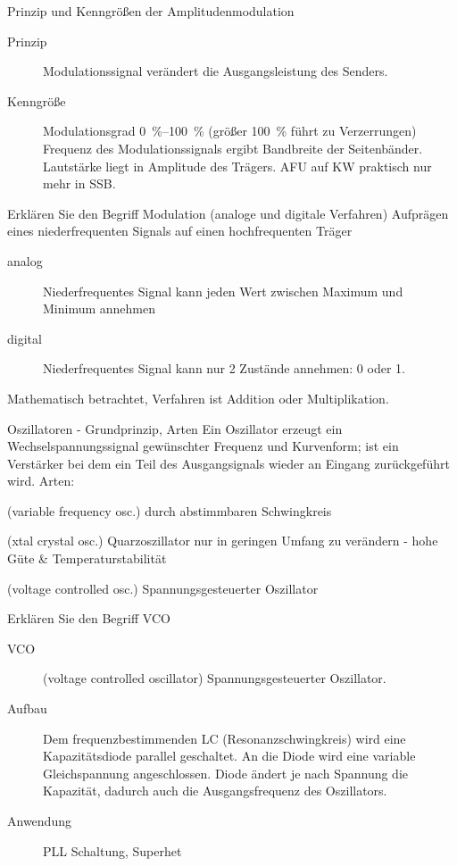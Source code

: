\documentclass[avery5371,grid,frame,a4paper]{flashcards}
\newcommand{\card}[3]{
  \begin{flashcard}[{\chap} -- #1]{#2}#3\end{flashcard}
}
\begin{document}
\card{50}{Prinzip und Kenngrößen der Amplitudenmodulation}{
  \begin{description}
    \item[Prinzip]
      Modulationssignal verändert die Ausgangsleistung des Senders.
    \item[Kenngröße]
      Modulationsgrad \SIrange{0}{100}{\percent} (größer \SI{100}{\percent} führt zu Verzerrungen)
        Frequenz des Modulationssignals ergibt Bandbreite der Seitenbänder.
        Lautstärke liegt in Amplitude des Trägers.
        AFU auf KW praktisch nur mehr in SSB.
  \end{description}
}
\card{51}{Erklären Sie den Begriff Modulation (analoge und digitale Verfahren)}{
  Aufprägen eines niederfrequenten Signals auf einen hochfrequenten Träger

  \begin{description}
    \item[analog] Niederfrequentes Signal kann jeden Wert zwischen Maximum und Minimum annehmen
    \item[digital] Niederfrequentes Signal kann nur 2 Zustände annehmen: 0 oder 1.
  \end{description}

  Mathematisch betrachtet, Verfahren ist Addition oder Multiplikation.
}
\card{52}{Oszillatoren - Grundprinzip, Arten}{
  \small
  Ein Oszillator erzeugt ein Wechselspannungssignal gewünschter Frequenz und Kurvenform; ist ein Verstärker bei dem ein Teil des Ausgangsignals wieder an Eingang zurückgeführt wird. Arten:
  \begin{description}\itemsep0pt
    \item[VFO]
      (variable frequency osc.)
      durch abstimmbaren Schwingkreis
    \item[X(C)O]
      (xtal crystal osc.)
      Quarzoszillator nur in geringen Umfang zu verändern - hohe Güte \& Temperaturstabilität
    \item[VCO]
      (voltage controlled osc.)
      Spannungsgesteuerter Oszillator
  \end{description}
}
\card{53}{Erklären Sie den Begriff VCO}{
  \begin{description}
    \item[VCO] (voltage controlled oscillator)
      Spannungsgesteuerter Oszillator.
    \item[Aufbau]
      Dem frequenzbestimmenden LC (Resonanzschwingkreis) wird eine Kapazitätsdiode parallel geschaltet.
      An die Diode wird eine variable Gleichspannung angeschlossen.
      Diode ändert je nach Spannung die Kapazität, dadurch auch die Ausgangsfrequenz des Oszillators.
    \item[Anwendung] PLL Schaltung, Superhet
  \end{description}
}
\end{document}
